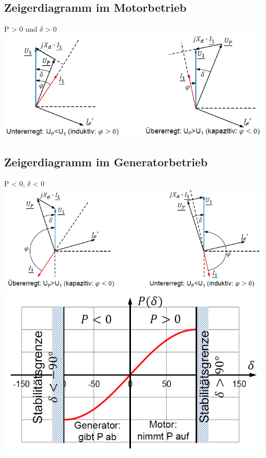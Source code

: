 \subsection{Zeigerdiagramm im Motorbetrieb}
    P > 0 und $\delta$ > 0 \newline \newline
    \includegraphics[width = 12 cm]{images/ZeigerdiagrammSynchronmaschine}

\subsection{Zeigerdiagramm im Generatorbetrieb}
    P < 0, $\delta$ < 0  \newline
    \includegraphics[width = 12 cm]{images/ZeigerdiagrammGeneratorbetrieb} \newline \newline
    \includegraphics[scale = 0.4]{images/Stabilitaet}



\clearpage
\pagebreak
